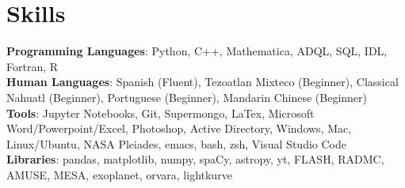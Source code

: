 \documentclass[a4paper,11pt]{article}
\begin{document}
\section{Skills}
 \begin{itemize}[leftmargin=0.15in, label={}]
    \small{\item{
     \textbf{Programming Languages}{: Python, C++, Mathematica, ADQL, SQL, IDL, Fortran, R} \\
     \vspace{1mm}
     \textbf{Human Languages}{: Spanish (Fluent), Tezoatlan Mixteco (Beginner), Classical Nahuatl (Beginner), Portuguese (Beginner), Mandarin Chinese (Beginner)} \\
     \vspace{1mm}
     \textbf{Tools}{: Jupyter Notebooks, Git, Supermongo, LaTex, Microsoft Word/Powerpoint/Excel, Photoshop, Active Directory, Windows, Mac, Linux/Ubuntu, NASA Pleiades, emacs, bash, zsh, Visual Studio Code} \\
     \vspace{1mm}
     \textbf{Libraries}{: pandas, matplotlib, numpy, spaCy, astropy, yt, FLASH, RADMC, AMUSE, MESA, exoplanet, orvara, lightkurve}
     }
     }
 \end{itemize}


%

\end{document}
